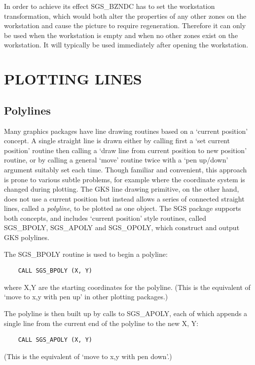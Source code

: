 \documentclass[11pt]{article}
\newcommand{\htmlref}[2]{#1}
\begin{document}
In order to achieve its effect SGS\_BZNDC has to set the workstation
transformation, which would both alter the properties of any other zones
on the workstation and cause the picture to require regeneration. Therefore
it can only be used when the workstation is empty and when no other zones
exist on the workstation. It will typically be used immediately after opening
the workstation.

\section {PLOTTING LINES}\label{sec-lines}

\subsection {Polylines}
Many graphics packages have line drawing routines based on a
`current position' concept.  A single straight line
is drawn either by calling first a `set current position' routine
then calling a `draw line from current position to new
position' routine, or by calling a general `move' routine
twice with a `pen up/down' argument suitably set each time.  Though
familiar and convenient, this approach is prone to various
subtle problems, for example where the coordinate system is
changed during plotting.  The
GKS line drawing primitive,
on the other hand, does not use a current position but instead
allows a series of connected
straight lines, called a {\em polyline},
to be plotted as one object.  The SGS package supports both
concepts, and includes `current position' style routines,
called 
\htmlref{SGS\_BPOLY}{SGS_BPOLY}, 
\htmlref{SGS\_APOLY}{SGS_APOLY} and 
\htmlref{SGS\_OPOLY}{SGS_OPOLY},
which construct and output GKS polylines.

The SGS\_BPOLY
routine is used to begin a polyline:
\begin{verbatim}
    CALL SGS_BPOLY (X, Y)
\end{verbatim}
where X,Y are the starting coordinates for the polyline.  (This
is the equivalent of `move to x,y with pen up' in other
plotting packages.)

The polyline
is then built up by calls to SGS\_APOLY, each of which appends
a single line from the current end of the polyline
to the new X, Y:
\begin{verbatim}
    CALL SGS_APOLY (X, Y)
\end{verbatim}
(This is the equivalent of `move to x,y with pen down'.)
\end{document}
